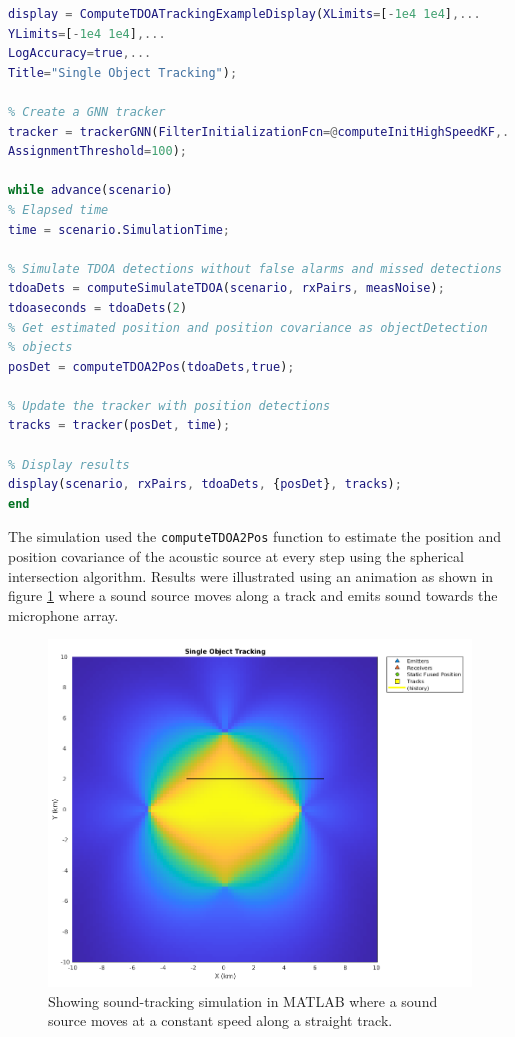 \documentclass[a4paper,11pt]{article}
\begin{document}
\begin{lstlisting}[language=MATLAB, caption={Showing while loop for continuously tracking the microphone location.}, label=list:matlab]
% Display object
display = ComputeTDOATrackingExampleDisplay(XLimits=[-1e4 1e4],...
YLimits=[-1e4 1e4],...
LogAccuracy=true,...
Title="Single Object Tracking");

% Create a GNN tracker
tracker = trackerGNN(FilterInitializationFcn=@computeInitHighSpeedKF,...
AssignmentThreshold=100);

while advance(scenario)
% Elapsed time
time = scenario.SimulationTime;

% Simulate TDOA detections without false alarms and missed detections
tdoaDets = computeSimulateTDOA(scenario, rxPairs, measNoise);
tdoaseconds = tdoaDets(2)
% Get estimated position and position covariance as objectDetection
% objects
posDet = computeTDOA2Pos(tdoaDets,true);

% Update the tracker with position detections
tracks = tracker(posDet, time);

% Display results
display(scenario, rxPairs, tdoaDets, {posDet}, tracks);
end
\end{lstlisting}
The simulation used the \texttt{computeTDOA2Pos} function to estimate the position and position covariance of the acoustic source at every step using the spherical intersection algorithm. Results were illustrated using an animation as shown in figure \ref{fig:track} where a sound source moves along a track and emits sound towards the microphone array. 

\begin{figure}[ht!]
	\centering
	\includegraphics[width=1.0\linewidth]{track.png}
	\caption{Showing sound-tracking simulation in MATLAB where a sound source moves at a constant speed along a straight track.}
	\label{fig:track}
\end{figure}
\end{document}
